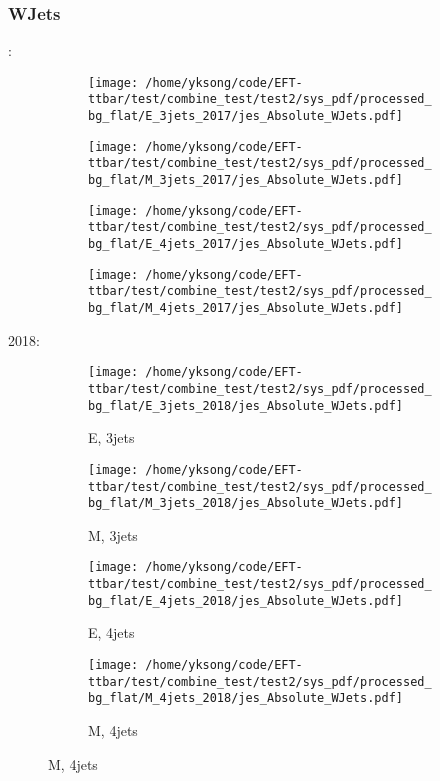 \documentclass{beamer}
\begin{document}
\begin{frame}
\frametitle{WJets}
\fontsize{5}{1}:
\begin{figure}
\centering
\begin{subfigure}[b]{0.24\textwidth}
\texttt{[image: /home/yksong/code/EFT-ttbar/test/combine\_test/test2/sys\_pdf/processed\_bg\_flat/E\_3jets\_2017/jes\_Absolute\_WJets.pdf]}
\end{subfigure}
\begin{subfigure}[b]{0.24\textwidth}
\texttt{[image: /home/yksong/code/EFT-ttbar/test/combine\_test/test2/sys\_pdf/processed\_bg\_flat/M\_3jets\_2017/jes\_Absolute\_WJets.pdf]}
\end{subfigure}
\begin{subfigure}[b]{0.24\textwidth}
\texttt{[image: /home/yksong/code/EFT-ttbar/test/combine\_test/test2/sys\_pdf/processed\_bg\_flat/E\_4jets\_2017/jes\_Absolute\_WJets.pdf]}
\end{subfigure}
\begin{subfigure}[b]{0.24\textwidth}
\texttt{[image: /home/yksong/code/EFT-ttbar/test/combine\_test/test2/sys\_pdf/processed\_bg\_flat/M\_4jets\_2017/jes\_Absolute\_WJets.pdf]}
\end{subfigure}
\end{figure}
2018:
\begin{figure}
\centering
\begin{subfigure}[b]{0.24\textwidth}
\texttt{[image: /home/yksong/code/EFT-ttbar/test/combine\_test/test2/sys\_pdf/processed\_bg\_flat/E\_3jets\_2018/jes\_Absolute\_WJets.pdf]}
\captionsetup{font=tiny}
\caption{E, 3jets}
\end{subfigure}
\begin{subfigure}[b]{0.24\textwidth}
\texttt{[image: /home/yksong/code/EFT-ttbar/test/combine\_test/test2/sys\_pdf/processed\_bg\_flat/M\_3jets\_2018/jes\_Absolute\_WJets.pdf]}
\captionsetup{font=tiny}
\caption{M, 3jets}
\end{subfigure}
\begin{subfigure}[b]{0.24\textwidth}
\texttt{[image: /home/yksong/code/EFT-ttbar/test/combine\_test/test2/sys\_pdf/processed\_bg\_flat/E\_4jets\_2018/jes\_Absolute\_WJets.pdf]}
\captionsetup{font=tiny}
\caption{E, 4jets}
\end{subfigure}
\begin{subfigure}[b]{0.24\textwidth}
\texttt{[image: /home/yksong/code/EFT-ttbar/test/combine\_test/test2/sys\_pdf/processed\_bg\_flat/M\_4jets\_2018/jes\_Absolute\_WJets.pdf]}
\captionsetup{font=tiny}
\caption{M, 4jets}
\end{subfigure}
\end{figure}
\end{frame}
\end{document}
